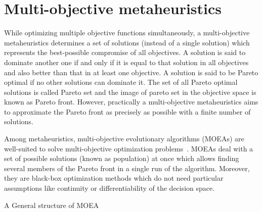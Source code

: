 \section{Multi-objective metaheuristics}
\label{sec:mop}
While optimizing multiple objective functions simultaneously, a multi-objective metaheuristics determines a set of solutions (instead of a single solution) which represents the best-possible compromise of all objectives. A solution is said to dominate another one if and only if it is equal to that solution in all objectives and also better than that in at least one objective. A solution is said to be Pareto optimal if no other solutions can dominate it. The set of all Pareto optimal solutions is called Pareto set and the image of pareto set in the objective space is known as Pareto front. However, practically a multi-objective metaheuristics aims to approximate the Pareto front as precisely as possible with a finite number of solutions.

Among metaheuristics, multi-objective evolutionary algorithms (MOEAs) are well-suited to solve multi-objective optimization problems~\cite{yang2013grid}. MOEAs deal with a set of possible solutions (known as population) at once which allows finding several members of the Pareto front in a single run of the algorithm. Moreover, they are  black-box optimization methods which do not need particular assumptions like continuity or differentiability of the decision space. 


\begin{algorithm}[!htb]
	\caption{A General structure of MOEA}
	\begin{algorithmic}[1]\label{alg:MaOEA}
		\ENDWHILE
	\end{algorithmic}
\end{algorithm}


